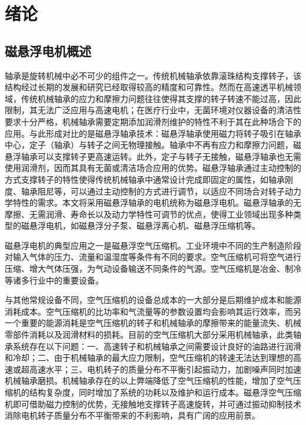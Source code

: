 \documentclass[
  lang=cn,
  degree=master,
  openany,oneside
]{nuaathesis}
\begin{document}
\makecover
\makedeclare
\frontmatter
\makeabstract
\nuaatableofcontents
\nuaalistoffigurestables


\mainmatter

\chapter{绪论}
\section{磁悬浮电机概述}
轴承是旋转机械中必不可少的组件之一。传统机械轴承依靠滚珠结构支撑转子，该结构经过长期的发展和研究已经取得较高的精度和可靠性。然而在高速透平机械领域，传统机械轴承的应力和摩擦力问题往往使得其支撑的转子转速不能过高，因此限制，其无法广泛应用与高速电机；在医疗行业中，无菌环境对仪器设备的清洁性要求十分严格，机械轴承需要定期添加润滑剂维护的特性不利于其在此种场合下的应用。与此形成对比的是磁悬浮轴承技术：磁悬浮轴承使用磁力将转子吸引在轴承中心，定子（轴承）与转子之间无物理接触。轴承中不再有应力和摩擦力问题，磁悬浮轴承可以支撑转子更高速运转。此外，定子与转子无接触，磁悬浮轴承也无需使用润滑剂，因而其具有无菌或清洁场合应用的优势。磁悬浮轴承通过主动控制的方式支撑转子的特性使得传统机械轴承中通常设计完成即固定的属性，如轴承刚度、轴承阻尼等，可以通过主动控制的方式进行调节，以适应不同场合对转子动力学特性的需求。本文将采用磁悬浮轴承的电机统称为磁悬浮电机。磁悬浮轴承的无摩擦、无需润滑、寿命长以及动力学特性可调节的优点，使得工业领域出现多种类型的磁悬浮电机，如磁悬浮分子泵、磁悬浮离心机、磁悬浮压缩机等。

磁悬浮电机的典型应用之一是磁悬浮空气压缩机。工业环境中不同的生产制造阶段对输入气体的压力、流量和温湿度等条件有不同的要求。空气压缩机可将空气进行压缩、增大气体压强，为气动设备输送不同条件的气源。空气压缩机是冶金、制冷等诸多行业中的重要设备。

与其他常规设备不同，空气压缩机的设备总成本的一大部分是后期维护成本和能源消耗成本。空气压缩机的比功率和气流量等的参数设置均会影响其运行效率，而另一个重要的能源消耗是空气压缩机的转子和机械轴承的摩擦带来的能量流失、机械零部件消耗以及润滑材料的损耗。目前的空气压缩机大部分采用机械轴承，此类轴承系统存在以下问题：一、高速转子和机械轴承之间需要设计良好的油路进行润滑和冷却；二、由于机械轴承的最大应力限制，空气压缩机的转速无法达到理想的高速或超高速水平；三、电机转子的质量分布不平衡引起振动力，加剧噪声同时加速机械轴承磨损。机械轴承存在的以上弊端降低了空气压缩机的性能，增加了空气压缩机的结构复杂度，同时增加了系统的功耗以及维护和运行成本。磁悬浮空气压缩机即可借助磁力控制的优势，无接触地支撑转子高速旋转，并可通过振动抑制技术消除电机转子质量分布不平衡带来的不利影响，具有广阔的应用前景。
\end{document}
